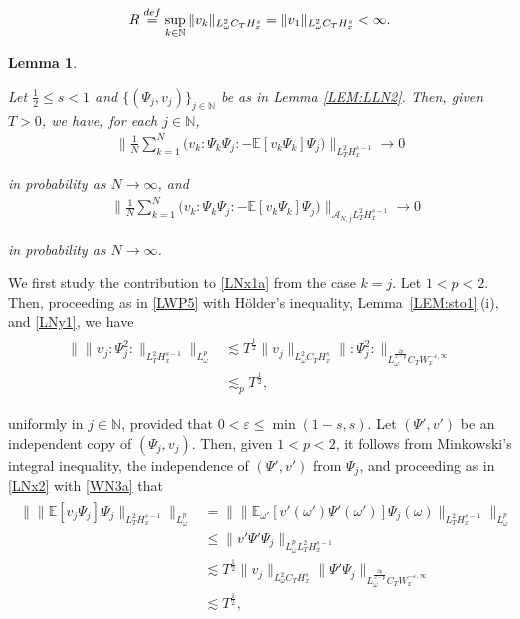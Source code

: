 \documentclass[10pt,a4paper]{amsart}
\newtheorem{lemma}{Lemma}
\newcommand{\A}{\mathcal{A}}
\newcommand{\E}{\mathbb{E}}
\newcommand{\N}{\mathbb{N}}
\newcommand{\deff}{\stackrel{\textup{def}}{=}}
\newcommand{\eps}{\varepsilon}
\newcommand{\les}{\lesssim}
\newcommand{\noi}{\noindent}
\renewcommand{\o}{\omega}
\newcommand{\wick}[1]{:\!{#1}\!:}
\begin{document}
\begin{align}
R\deff 
\sup_{k \in \N} 
\| v_k \|_{L^2_\o C_T H^s_x}
= 
\| v_1 \|_{L^2_\o C_T H^s_x}
 < \infty.
\label{LNy1}
\end{align}

\begin{lemma}
\label{LEM:LLN3}

Let $\frac 12  \le s < 1$
and $\{(\Psi_j, v_j)\}_{j \in \N}$ be as in Lemma \ref{LEM:LLN2}.
Then, given $T  > 0$, 
we have, for each $j \in \N$, 
\begin{align}
\bigg\| \frac 1N \sum_{k = 1}^N \Big( v_k\! \wick{\Psi_k \Psi_j} 
- \E [ v_k\Psi_k ] \Psi_j \Big) \bigg\|_{L_T^2 H_x^{s-1}} \longrightarrow 0
\label{LNx1} 
\end{align}


\noi
in probability as $N \to \infty$, 
and
\begin{align}
&\bigg\| \frac 1N \sum_{k = 1}^N \Big( v_k \!\wick{\Psi_k \Psi_j} - \E [v_k\Psi_k ] \Psi_j \Big) 
\bigg\|_{\A_{N, j}L_T^2 H_x^{s-1}} \longrightarrow 0
\label{LNx1a}
\end{align}


\noi
in probability as $N \to \infty$.


\end{lemma}

We first study the contribution to \eqref{LNx1a} from  the case $k = j$.
Let $1 < p < 2$.
Then, 
proceeding as in  \eqref{LWP5}
with H\"older's inequality, 
 Lemma~\ref{LEM:sto1}\,(i), and \eqref{LNy1}, we have 
\begin{align}
\begin{split}
\Big\| \| v_j \! \wick{\Psi_j^2} \|_{L_T^2 H_x^{s-1}} \Big\|_{L^p_\o}
&\les T^\frac 12  \| v_j \|_{L^2_\o C_T  H_x^{s}}
 \| \wick{\Psi_j^2} \|_{L^\frac{2p}{2-p}_\o C_T  W_x^{- \eps, \infty}}\\
 & \les_p 
  T^\frac 12, 
\end{split}
\label{LNx2}
\end{align}

\noi
uniformly in $j \in \N$, 
provided that $0 < \eps \le \min(1-s,  s)$.
Let $(\Psi', v')$ be an independent copy of $(\Psi_j, v_j)$.
Then, given $1 < p < 2$, 
it follows from 
Minkowski's integral inequality, 
the independence of $(\Psi', v')$ from $\Psi_j$, 
and proceeding as in \eqref{LNx2} 
with \eqref{WN3a} that 
\begin{align}
\begin{split}
 \Big\| \| \E [ v_j \Psi_j ] \Psi_j \|_{L_T^2 H_x^{s-1}} \Big\|_{L^p_\o}
& = \Big\| \| \E_{\o'} [ v' (\o')  \Psi' (\o')] \Psi_j  (\o)\|_{L_T^2 H_x^{s-1}}\Big\|_{L^p_\o}\\
& \le
 \| v'  \Psi'   \Psi_j  \|_{L^p_\o L_T^2 H_x^{s-1}} \\
&\les T^\frac 12  \| v_j \|_{L^2_\o C_T  H_x^s}
 \|\Psi' \Psi_j  \|_{L^\frac {2p}{2-p}_\o C_T  W_x^{- \eps, \infty}}\\
 & \les 
  T^\frac 12, 
\end{split}
\label{LNx2a}
\end{align}
\end{document}

